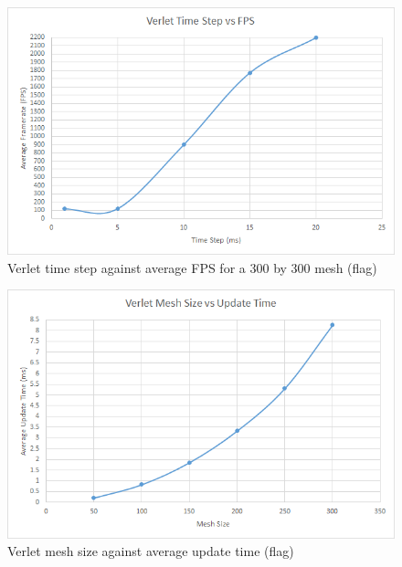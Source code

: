     \begin{figure}
    \begin{center}
      \includegraphics[scale=.9]{Figures/flag_v_ts_fps}
    \end{center}
    \caption{Verlet time step against average FPS for a 300 by 300 mesh (flag)}
    \label{fig:v step fps flag}
  \end{figure}
  
    \begin{figure}
    \begin{center}
      \includegraphics[scale=.9]{Figures/flag_v_m_ut}
    \end{center}
    \caption{Verlet mesh size against average update time (flag)}
    \label{fig:v mesh update flag}
  \end{figure}
  
